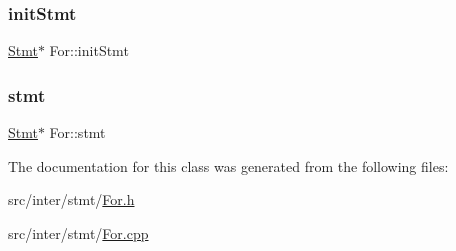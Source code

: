 \mbox{\label{class_for_a056889fe255686012e6a9197c2d514e7}} 
\subsubsection{\texorpdfstring{init\+Stmt}{initStmt}}
{\footnotesize\ttfamily \hyperlink{class_stmt}{Stmt}$\ast$ For\+::init\+Stmt}

\mbox{\label{class_for_af269abab55eae120cccbd1c76b0c5011}} 
\subsubsection{\texorpdfstring{stmt}{stmt}}
{\footnotesize\ttfamily \hyperlink{class_stmt}{Stmt}$\ast$ For\+::stmt}



The documentation for this class was generated from the following files\+:\begin{DoxyCompactItemize}
\item 
src/inter/stmt/\hyperlink{_for_8h}{For.\+h}\item 
src/inter/stmt/\hyperlink{_for_8cpp}{For.\+cpp}\end{DoxyCompactItemize}
